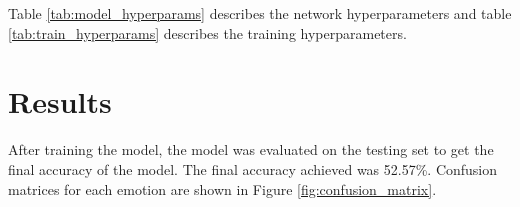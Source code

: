 \documentclass[conference]{IEEEtran}
\begin{document}
Table \ref{tab:model_hyperparams} describes the network hyperparameters and table \ref{tab:train_hyperparams} describes the training hyperparameters.

\begin{table}[b]
	\caption{The model's hyperparameters.}
	\label{tab:model_hyperparams}
\end{table}

\begin{table}[]
	\caption{The training hyperparameters.}
	\label{tab:train_hyperparams}
\end{table}

\section{Results}

After training the model, the model was evaluated on the testing set to get the final accuracy of the model. The final accuracy achieved was 52.57\%. Confusion matrices for each emotion are shown in Figure \ref{fig:confusion_matrix}.
\end{document}
